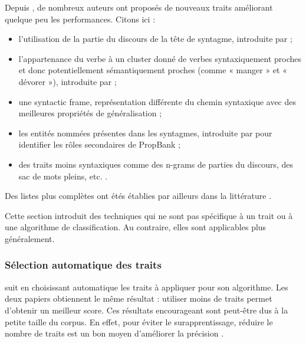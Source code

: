 Depuis \cite{gildea2002automatic}, de nombreux auteurs ont proposés de nouveaux
traits améliorant quelque peu les performances. Citons ici :

\begin{itemize}

    \item l'utilisation de la partie du discours de la tête de syntagme,
        introduite par \cite{surdeanu2003using} ;

    \item l'appartenance du verbe à un cluster donné de verbes syntaxiquement
        proches et donc potentiellement sémantiquement proches (comme « manger
        » et « dévorer »), introduite par \cite{pradhan2004shallow} ;

    \item une {syntactic frame}, représentation différente du chemin syntaxique
        avec des meilleures propriétés de généralisation
        \citep{xue2004calibrating} ;

    \item les entités nommées présentes dans les syntagmes, introduite par
        \cite{pradhan2005semantic} pour identifier les rôles secondaires de
        PropBank ;

    \item des traits moins syntaxiques comme des n-grams de parties du
        discours, des sac de mots pleins, etc. \citep{surdeanu2007combination}.

\end{itemize}

Des listes plus complètes ont étés établies par ailleurs dans la littérature
\citep{pradhan2005semantic,marquez2008semantic,palmer2010semantic}.

Cette section introduit des techniques qui ne sont pas spécifique à un trait ou
à une algorithme de classification. Au contraire, elles sont applicables plus
généralement.

\subsubsection{Sélection automatique des traits}

\cite{dinu2007sometimes} suit \cite{mihalcea2002instance} en choisissant
automatique les traits à appliquer pour son algorithme. Les deux papiers
obtiennent le même résultat : utiliser moins de traits permet d'obtenir un
meilleur score. Ces résultats encourageant sont peut-être dus à la petite
taille du corpus. En effet, pour éviter le surapprentissage, réduire le nombre
de traits est un bon moyen d'améliorer la précision \citep{van2004bias}.

